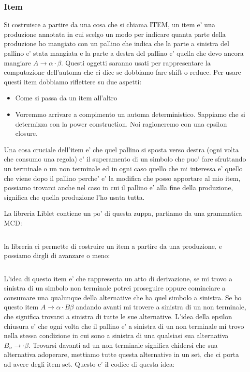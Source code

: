 \subsubsection{Item}
Si costruisce a partire da una cosa che si chiama ITEM, un item e' una produzione annotata in cui scelgo un modo per indicare quanta parte della produzione ho mangiato con un pallino che indica che la parte a sinistra del pallino e' stata mangiata e la parte a destra del pallino e' quella che devo ancora mangiare $A \rightarrow \alpha \cdot \beta$.
Questi oggetti saranno usati per rappresentare la computazione dell'automa che ci dice se dobbiamo fare shift o reduce. Per usare questi item dobbiamo riflettere su due aspetti:
\begin{itemize}
  \item Come si passa da un item all'altro
  \item Vorremmo arrivare a compimento un automa deterministico. Sappiamo che si determizza con la power construction. Noi ragioneremo con una epsilon closure.
\end{itemize}

Una cosa cruciale dell'item e' che quel pallino si sposta verso destra (ogni volta che consumo una regola) e' il superamento di un simbolo che puo' fare sfruttando un terminale o un non terminale ed in ogni caso quello che mi interessa e' quello che viene dopo il pallino perche' e' la modifica che posso apportare al mio item, possiamo trovarci anche nel caso in cui il pallino e' alla fine della produzione, significa che quella produzione l'ho usata tutta.

La libreria Liblet contiene un po' di questa zuppa, partiamo da una grammatica MCD:
\begin{lstlisting}

\end{lstlisting}

la libreria ci permette di costruire un item a partire da una produzione, e possiamo dirgli di avanzare o meno:
\begin{lstlisting}

\end{lstlisting}

L'idea di questo item e' che rappresenta un atto di derivazione, se mi trovo a sinistra di un simbolo non terminale potrei proseguire oppure cominciare a consumare una qualunque della alternative che ha quel simbolo a sinistra. Se ho questo item $A \rightarrow \alpha \cdot B \beta$ andando avanti mi trovere a sinistra di un non terminale, che significa trovarsi a sinistra di tutte le sue alternative. L'idea della epsilon chiusura e' che ogni volta che il pallino e' a sinistra di un non terminale mi trovo nella stessa condizione in cui sono a sinistra di una qualsiasi sua alternativa $B_n \rightarrow \cdot \beta$.
Trovarsi davanti ad un non terminale significa chidersi che sua alternativa adoperare, mettiamo tutte questa alternative in un set, che ci porta ad avere degli item set.
Questo e' il codice di questa idea:
\begin{lstlisting}

\end{lstlisting}

